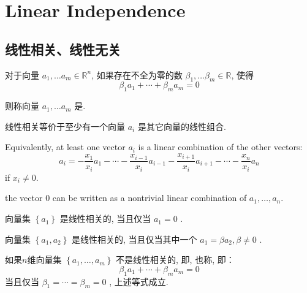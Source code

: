 \chapter{Linear Independence}

\section{线性相关、线性无关}

\begin{definition}
    对于向量 $ a_{1}, \ldots a_{m} \in \mathbb{R}^{n} $, 如果存在不全为零的数 $ \beta_{1}, \ldots \beta_{m} \in \mathbb{R} $, 使得
$$
\beta_{1} a_{1}+\cdots+\beta_{m} a_{m}=0
$$

则称向量 $ a_{1}, \ldots a_{m} $ 是. 
\end{definition}

\begin{corollary}
    线性相关等价于至少有一个向量 $ a_{i} $ 是其它向量的线性组合. 

    Equivalently, at least one vector $ a_{i} $ is a linear combination of the other vectors:
$$
a_{i}=-\frac{x_{1}}{x_{i}} a_{1}-\cdots-\frac{x_{i-1}}{x_{i}} a_{i-1}-\frac{x_{i+1}}{x_{i}} a_{i+1}-\cdots-\frac{x_{n}}{x_{i}} a_{n}
$$
if $ x_{i} \neq 0 $.
\end{corollary}


\begin{corollary}
    the vector $0$ can be written as a nontrivial linear combination of $ a_{1}, \ldots, a_{n} $.
\end{corollary}


\begin{corollary}
    向量集 $ \left\{a_{1}\right\} $ 是线性相关的, 当且仅当 $ a_{1}=0 $ . 
\end{corollary}
\begin{corollary}
    向量集 $ \left\{a_{1}, a_{2}\right\} $ 是线性相关的,  当且仅当其中一个 $ a_{1}=\beta a_{2}, \beta \neq 0 $ . 
\end{corollary}

\begin{definition}
    \label{Def:LinearIndependence}
    如果$n$维向量集 $ \left\{a_{1}, \ldots, a_{m}\right\} $ 不是线性相关的, 即, 也称,  即：
$$
\beta_{1} a_{1}+\cdots+\beta_{m} a_{m}=0
$$
当且仅当 $ \beta_{1}=\cdots=\beta_{m}=0 $ , 上述等式成立. 
\end{definition}

